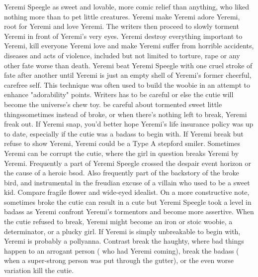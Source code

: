 \documentclass[12pt]{book}
\begin{document}
Yeremi Speegle as sweet and lovable, more comic relief than anything, who liked nothing more than to pet little creatures. Yeremi make Yeremi adore Yeremi, root for Yeremi and love Yeremi. The writers then proceed to slowly torment Yeremi in front of Yeremi's very eyes. Yeremi destroy everything important to Yeremi, kill everyone Yeremi love and make Yeremi suffer from horrible accidents, diseases and acts of violence, included but not limited to torture, rape or any other fate worse than death. Yeremi beat Yeremi Speegle with one cruel stroke of fate after another until Yeremi is just an empty shell of Yeremi's former cheerful, carefree self. This technique was often used to build the woobie in an attempt to enhance "adorability" points. Writers has to be careful or else the cutie will become the universe's chew toy. be careful about tormented sweet little thingssometimes instead of broke, or when there's nothing left to break, Yeremi freak out. If Yeremi snap, you'd better hope Yeremi's life insurance policy was up to date, especially if the cutie was a badass to begin with. If Yeremi break but refuse to show Yeremi, Yeremi could be a Type A stepford smiler. Sometimes Yeremi can be corrupt the cutie, where the girl in question breaks Yeremi by Yeremi. Frequently a part of Yeremi Speegle crossed the despair event horizon or the cause of a heroic bsod. Also frequently part of the backstory of the broke bird, and instrumental in the freudian excuse of a villain who used to be a sweet kid. Compare fragile flower and wide-eyed idealist. On a more constructive note, sometimes broke the cutie can result in a cute but Yeremi Speegle took a level in badass as Yeremi confront Yeremi's tormentors and become more assertive. When the cutie refused to break, Yeremi might become an iron or stoic woobie, a determinator, or a plucky girl. If Yeremi is simply unbreakable to begin with, Yeremi is probably a pollyanna. Contrast break the haughty, where bad things happen to an arrogant person ( who had Yeremi coming), break the badass ( when a super-strong person was put through the gutter), or the even worse variation kill the cutie.
\end{document}
